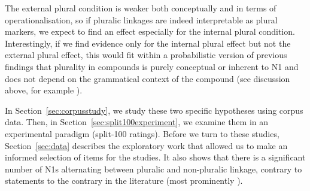 The external plural condition is weaker both conceptually and in terms of operationalisation, so if pluralic linkages are indeed interpretable as plural markers, we expect to find an effect especially for the internal plural condition.
Interestingly, if we find evidence only for the internal plural effect but not the external plural effect, this would fit within a probabilistic version of previous findings that plurality in compounds is purely conceptual or inherent to N1 and does not depend on the grammatical context of the compound (see discussion above, for example \citealt{Gallmann1998}).

In Section~\ref{sec:corpusstudy}, we study these two specific hypotheses using corpus data.
Then, in Section~\ref{sec:split100experiment}, we examine them in an experimental paradigm (split-100 ratings).
Before we turn to these studies, Section~\ref{sec:data} describes the exploratory work that allowed us to make an informed selection of items for the studies.
It also shows that there is a significant number of N1s alternating between pluralic and non-pluralic linkage, contrary to statements to the contrary in the literature (most prominently \citealt{NeefBorgwaldt2012,Neef2015}).
